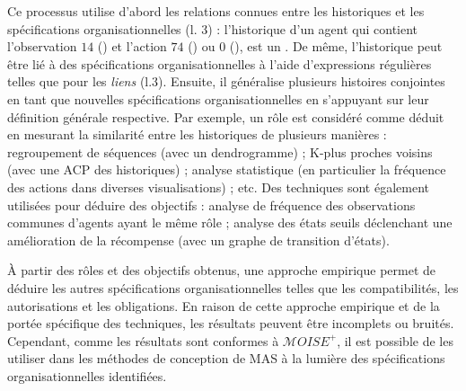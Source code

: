 Ce processus utilise d'abord les relations connues entre les historiques et les spécifications organisationnelles (l. 3) : l'historique d'un agent qui contient l'observation $14$ () et l'action $74$ () ou $0$ (), est un . De même, l'historique peut être lié à des spécifications organisationnelles à l'aide d'expressions régulières telles que pour les \emph{liens} (l.3).
Ensuite, il généralise plusieurs histoires conjointes en tant que nouvelles spécifications organisationnelles en s'appuyant sur leur définition générale respective.
%
Par exemple, un rôle est considéré comme déduit en mesurant la similarité entre les historiques de plusieurs manières : regroupement de séquences (avec un dendrogramme) ; K-plus proches voisins (avec une ACP des historiques) ; analyse statistique (en particulier la fréquence des actions dans diverses visualisations) ; etc.
%
Des techniques sont également utilisées pour déduire des objectifs : analyse de fréquence des observations communes d'agents ayant le même rôle ; analyse des états seuils déclenchant une amélioration de la récompense (avec un graphe de transition d'états).

À partir des rôles et des objectifs obtenus, une approche empirique permet de déduire les autres spécifications organisationnelles telles que les compatibilités, les autorisations et les obligations.
En raison de cette approche empirique et de la portée spécifique des techniques, les résultats peuvent être incomplets ou bruités. Cependant, comme les résultats sont conformes à $\mathcal{M}OISE^+$, il est possible de les utiliser dans les méthodes de conception de MAS à la lumière des spécifications organisationnelles identifiées.





